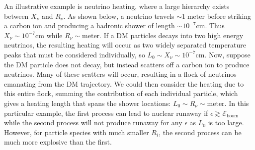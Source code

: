 \documentclass[twocolumn,showpacs,preprintnumbers,amsmath,amssymb,prd]{revtex4}
\begin{document}
An illustrative example is neutrino heating, where a large hierarchy exists between $X_\nu$ and $R_\nu$.
As shown below, a neutrino travels $\sim 1\;\text{meter}$ before striking a carbon ion and producing a hadronic shower of length $ \sim 10^{-7} \text{cm}$.
Thus $X_\nu \sim 10^{-7} \text{cm}$ while $R_\nu \sim \text{meter}$.
If a DM particles decays into two high energy neutrinos, the resulting heating will occur as two widely separated temperature peaks that must be considered individually, so $L_0 \sim X_\nu \sim 10^{-7} \text{cm}$.
Now, suppose the DM particle does not decay, but instead scatters off a carbon ion to produce neutrinos.
Many of these scatters will occur, resulting in a flock of neutrinos emanating from the DM trajectory.  
We could then consider the heating due to this entire flock, summing the contribution of each individual particle, which gives a heating length that spans the shower locations: $L_0 \sim R_\nu \sim \text{meter}$. 
In this particular example, the first process can lead to nuclear runaway if $\epsilon \gtrsim \mathcal{E}_\text{boom}$ while the second process will not produce runaway for any $\epsilon$ as $L_0$ is too large.
However, for particle species with much smaller $R_i$, the second process can be much more explosive than the first.
\end{document}
